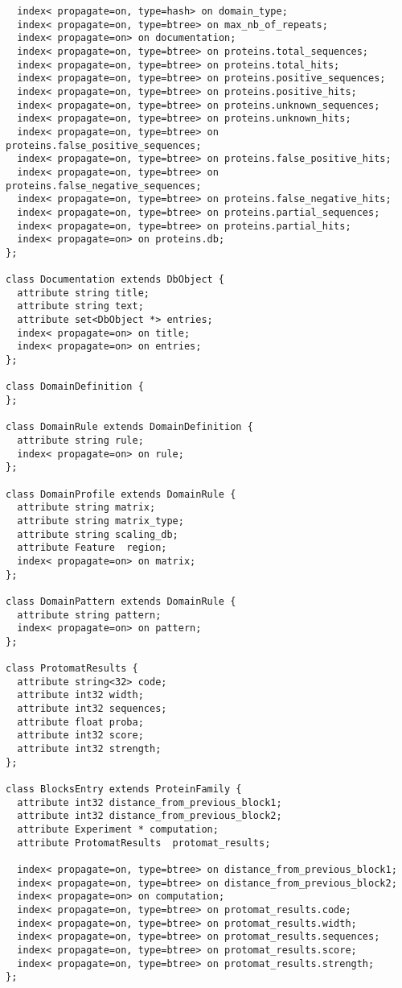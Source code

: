 \begin{verbatim}
  index< propagate=on, type=hash> on domain_type;
  index< propagate=on, type=btree> on max_nb_of_repeats;
  index< propagate=on> on documentation;
  index< propagate=on, type=btree> on proteins.total_sequences;
  index< propagate=on, type=btree> on proteins.total_hits;
  index< propagate=on, type=btree> on proteins.positive_sequences;
  index< propagate=on, type=btree> on proteins.positive_hits;
  index< propagate=on, type=btree> on proteins.unknown_sequences;
  index< propagate=on, type=btree> on proteins.unknown_hits;
  index< propagate=on, type=btree> on proteins.false_positive_sequences;
  index< propagate=on, type=btree> on proteins.false_positive_hits;
  index< propagate=on, type=btree> on proteins.false_negative_sequences;
  index< propagate=on, type=btree> on proteins.false_negative_hits;
  index< propagate=on, type=btree> on proteins.partial_sequences;
  index< propagate=on, type=btree> on proteins.partial_hits;
  index< propagate=on> on proteins.db;
};

class Documentation extends DbObject {
  attribute string title;
  attribute string text;
  attribute set<DbObject *> entries;
  index< propagate=on> on title;
  index< propagate=on> on entries;
};

class DomainDefinition {
};

class DomainRule extends DomainDefinition {
  attribute string rule;
  index< propagate=on> on rule;
};

class DomainProfile extends DomainRule {
  attribute string matrix;
  attribute string matrix_type;
  attribute string scaling_db;
  attribute Feature  region;
  index< propagate=on> on matrix;
};

class DomainPattern extends DomainRule {
  attribute string pattern;
  index< propagate=on> on pattern;
};

class ProtomatResults {
  attribute string<32> code;
  attribute int32 width;
  attribute int32 sequences;
  attribute float proba;
  attribute int32 score;
  attribute int32 strength;
};

class BlocksEntry extends ProteinFamily {
  attribute int32 distance_from_previous_block1;
  attribute int32 distance_from_previous_block2;
  attribute Experiment * computation;
  attribute ProtomatResults  protomat_results;

  index< propagate=on, type=btree> on distance_from_previous_block1;
  index< propagate=on, type=btree> on distance_from_previous_block2;
  index< propagate=on> on computation;
  index< propagate=on, type=btree> on protomat_results.code;
  index< propagate=on, type=btree> on protomat_results.width;
  index< propagate=on, type=btree> on protomat_results.sequences;
  index< propagate=on, type=btree> on protomat_results.score;
  index< propagate=on, type=btree> on protomat_results.strength;
};


\end{verbatim}
